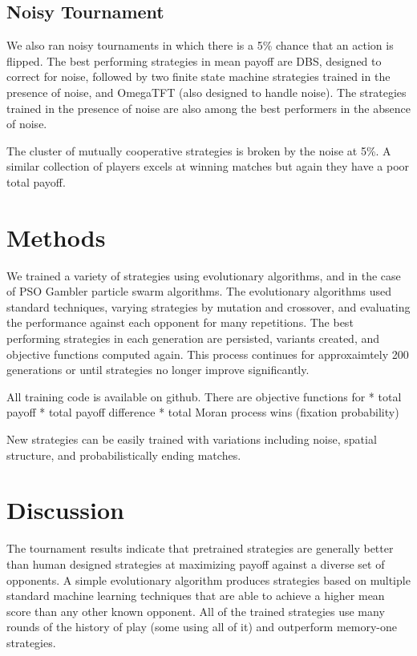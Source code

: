 \documentclass{article}
\begin{document}
\subsection{Noisy Tournament}

We also ran noisy tournaments in which there is a 5\% chance that an action
is flipped. The best performing strategies in mean payoff are DBS, designed
to correct for noise, followed by two finite state machine strategies trained
in the presence of noise, and OmegaTFT (also designed to handle noise). The
strategies trained in the presence of noise are also among the best performers
in the absence of noise.

The cluster of mutually cooperative strategies is broken by the noise at 5\%. A
similar collection of players excels at winning matches but again they have
a poor total payoff.


\section{Methods}

We trained a variety of strategies using evolutionary algorithms, and in the
case of PSO Gambler particle swarm algorithms. The evolutionary algorithms
used standard techniques, varying strategies by mutation and crossover, and
evaluating the performance against each opponent for many repetitions. The
best performing strategies in each generation are persisted, variants created,
and objective functions computed again. This process continues for approxaimtely
200 generations or until strategies no longer improve significantly.


All training code is available on github. There are objective functions for
* total payoff
* total payoff difference
* total Moran process wins (fixation probability)

New strategies can be easily trained with variations including noise, spatial
structure, and probabilistically ending matches.

\section{Discussion}

The tournament results indicate that pretrained strategies are generally better
than human designed strategies at maximizing payoff against a diverse set of
opponents. A simple evolutionary algorithm produces strategies based on multiple
standard machine learning techniques that are able to achieve a higher mean
score than any other known opponent. All of the trained strategies use many
rounds of the history of play (some using all of it) and outperform memory-one
strategies.
\end{document}
